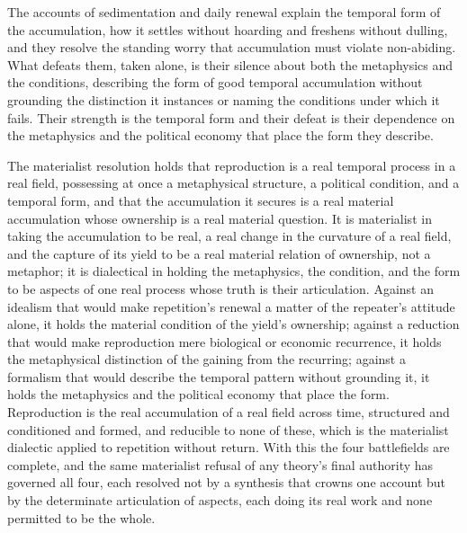 The accounts of sedimentation and daily renewal explain the temporal form of the accumulation, how it settles without hoarding and freshens without dulling, and they resolve the standing worry that accumulation must violate non-abiding. What defeats them, taken alone, is their silence about both the metaphysics and the conditions, describing the form of good temporal accumulation without grounding the distinction it instances or naming the conditions under which it fails. Their strength is the temporal form and their defeat is their dependence on the metaphysics and the political economy that place the form they describe.

The materialist resolution holds that reproduction is a real temporal process in a real field, possessing at once a metaphysical structure, a political condition, and a temporal form, and that the accumulation it secures is a real material accumulation whose ownership is a real material question. It is materialist in taking the accumulation to be real, a real change in the curvature of a real field, and the capture of its yield to be a real material relation of ownership, not a metaphor; it is dialectical in holding the metaphysics, the condition, and the form to be aspects of one real process whose truth is their articulation. Against an idealism that would make repetition's renewal a matter of the repeater's attitude alone, it holds the material condition of the yield's ownership; against a reduction that would make reproduction mere biological or economic recurrence, it holds the metaphysical distinction of the gaining from the recurring; against a formalism that would describe the temporal pattern without grounding it, it holds the metaphysics and the political economy that place the form. Reproduction is the real accumulation of a real field across time, structured and conditioned and formed, and reducible to none of these, which is the materialist dialectic applied to repetition without return. With this the four battlefields are complete, and the same materialist refusal of any theory's final authority has governed all four, each resolved not by a synthesis that crowns one account but by the determinate articulation of aspects, each doing its real work and none permitted to be the whole.

